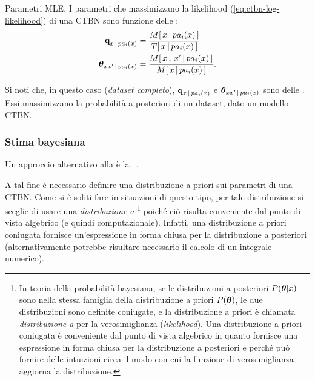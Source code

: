 \begin{teorema}{Parametri \ac{MLE}.}
I parametri che massimizzano la likelihood (\autoref{eq:ctbn-log-likelihood}) di una \acl{CTBN} sono funzione delle \stats{}:
\begin{equation}
\label{eq:ctbn-params}\normalfont
\begin{split}
\param{q}_{\setel{x}\,\arrowvert\,pa_i(\setel{x})}&=\frac{\mstat{x\,\arrowvert\,pa_i(\setel{x})}}{\tstat{\setel{x}\,\arrowvert\,pa_i(\setel{x})}} \\
\param{$\theta$}_{\setel{x}\setel{x}^\prime\,\arrowvert\,pa_i(\setel{x})}&=\frac{\mstat[x]{\setel{x}^\prime\,\arrowvert\,pa_i(\setel{x})}}{\mstat{\setel{x}\,\arrowvert\,pa_i(\setel{x})}}\text{.}
\end{split}
\end{equation}
\end{teorema}
\normalfont
Si noti che, in questo caso (\emph{dataset completo}), $\boldsymbol{\textbf{\text{q}}}_{\mathnormal{x}\,\arrowvert\,pa_i(\mathnormal{x})}$ e $\boldsymbol{\textbf{\text{$\theta$}}}_{\mathnormal{x}\mathnormal{x}^\prime\,\arrowvert\,pa_i(\mathnormal{x})}$ sono delle \emph{}. Essi massimizzano la probabilità a posteriori di un dataset, dato un modello \acs{CTBN}.

\subsubsection{Stima bayesiana}
\label{sec:ctbn-bayesian-estimate}
Un approccio alternativo alla  è la ~\citep[si veda][sezione 5.1.1]{Nodelman2007}.

A tal fine è necessario definire una distribuzione a priori sui parametri di una \acs{CTBN}. Come si è soliti fare in situazioni di questo tipo, per tale distribuzione si sceglie di usare una \emph{distribuzione a }\footnote{\label{note:conjugate-prior}In teoria della probabilità bayesiana, se le distribuzioni a posteriori $P(\boldsymbol{\textbf{\text{$\theta$}}}|\mathnormal{x})$ sono nella stessa famiglia della distribuzione a priori $P(\boldsymbol{\textbf{\text{$\theta$}}})$, le due distribuzioni sono definite coniugate, e la distribuzione a priori è chiamata \emph{distribuzione a } per la verosimiglianza (\emph{likelihood}). Una distribuzione a priori coniugata è conveniente dal punto di vista algebrico in quanto fornisce una espressione in forma chiusa per la distribuzione a posteriori e perché può fornire delle intuizioni circa il modo con cui la funzione di verosimiglianza aggiorna la distribuzione.} poiché ciò risulta conveniente dal punto di vista algebrico (e quindi computazionale). Infatti, una distribuzione a priori coniugata fornisce un'espressione in forma chiusa per la distribuzione a posteriori (alternativamente potrebbe risultare necessario il calcolo di un integrale numerico).

